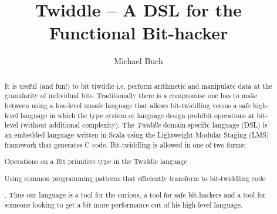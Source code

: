 \documentclass{article}
\title{Twiddle -- A DSL for the Functional Bit-hacker}
\author{Michael Buch}
\begin{document}
\maketitle
\frenchspacing

\begin{abstract}
It is useful (and fun!) to bit tiwddle i.e. perform arithmetic and manipulate data at the granularity of individual bits. Traditionally there is a compromise one has to make between using a low-level unsafe language that allows bit-twiddling versus a safe high-level language in which the type system or language design prohibit operations at bit-level (without additional complexity). The \textit{Twiddle} domain-specific language (DSL) is an embedded language written in Scala using the Lightweight Modular Staging (LMS) framework that generates C code. Bit-twiddling is allowed in one of two forms:
\begin{enumerate*}[label=(\arabic*)]
	\item Operations on a Bit primitive type in the Twiddle language
	\item Using common programming patterns that efficiently transform to bit-twiddling code
\end{enumerate*}.
Thus our language is a tool for the curious, a tool for safe bit-hackers and a tool for someone looking to get a bit more performance out of his high-level language.
\end{abstract}




\end{document}
